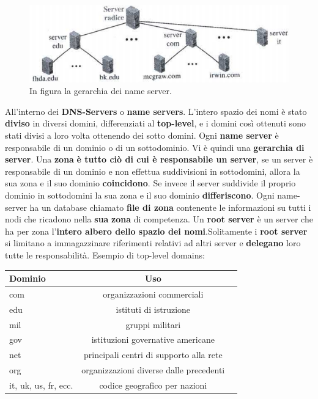 \documentclass[11pt,a4paper]{article}
\theoremstyle{definition}
\begin{document}
\begin{figure}[!h]
	\includegraphics[scale=0.6]{Immagini/Dnserver.png}
	\centering
	\caption{In figura la gerarchia dei name server.}
\end{figure}
All'interno dei \textbf{DNS-Servers} o \textbf{name servers}. L'intero spazio dei nomi è stato \textbf{diviso} in diversi domini, differenziati al \textbf{top-level}, e i domini così ottenuti sono stati divisi a loro volta ottenendo dei sotto domini. Ogni \textbf{name server} è responsabile di un dominio o di un sottodominio. Vi è quindi una \textbf{gerarchia di server}. Una \textbf{zona} \textbf{è tutto ciò di cui è responsabile un server}, se un server è responsabile di un dominio e non effettua suddivisioni in sottodomini, allora la sua zona e il suo dominio \textbf{coincidono}. Se invece il server suddivide il proprio dominio in sottodomini la sua zona e il suo dominio \textbf{differiscono}. Ogni name-server ha un database chiamato \textbf{file di zona} contenente le informazioni su tutti i nodi che ricadono nella \textbf{sua} \textbf{zona} di competenza. \newpage Un \textbf{root server} è un server che ha per zona l'\textbf{intero albero dello spazio dei nomi}.\newline Solitamente i \textbf{root server} si limitano a immagazzinare riferimenti relativi ad altri server e \textbf{delegano} loro tutte le responsabilità.\newline
Esempio di top-level domains:
\begin{table}[h!]
	\begin{center}
		\label{tab:table1}
		\begin{tabular}{l|c|r}
			\textbf{Dominio}     & \textbf{Uso}                            \\
			\hline
			com                  & organizzazioni commerciali              \\
			edu                  & istituti di istruzione                  \\
			mil                  & gruppi militari                         \\
			gov                  & istituzioni governative americane       \\
			net                  & principali centri di supporto alla rete \\
			org                  & organizzazioni diverse dalle precedenti \\
			it, uk, us, fr, ecc. & codice geografico per nazioni
			\\
		\end{tabular}
	\end{center}
\end{table}\newline
\end{document}
